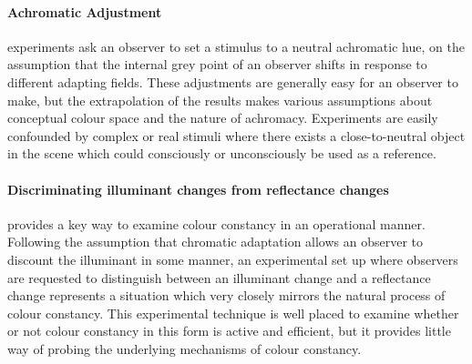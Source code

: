 \paragraph{Achromatic Adjustment} experiments ask an observer to set a stimulus to a neutral achromatic hue, on the assumption that the internal grey point of an observer shifts in response to different adapting fields. These adjustments are generally easy for an observer to make, but the extrapolation of the results makes various assumptions about conceptual colour space and the nature of achromacy. Experiments are easily confounded by complex or real stimuli where there exists a close-to-neutral object in the scene which could consciously or unconsciously be used as a reference.

\paragraph{Discriminating illuminant changes from reflectance changes} provides a key way to examine colour constancy in an operational manner. Following the assumption that chromatic adaptation allows an observer to discount the illuminant in some manner, an experimental set up where observers are requested to distinguish between an illuminant change and a reflectance change represents a situation which very closely mirrors the natural process of colour constancy. This experimental technique is well placed to examine whether or not colour constancy in this form is active and efficient, but it provides little way of probing the underlying mechanisms of colour constancy.











